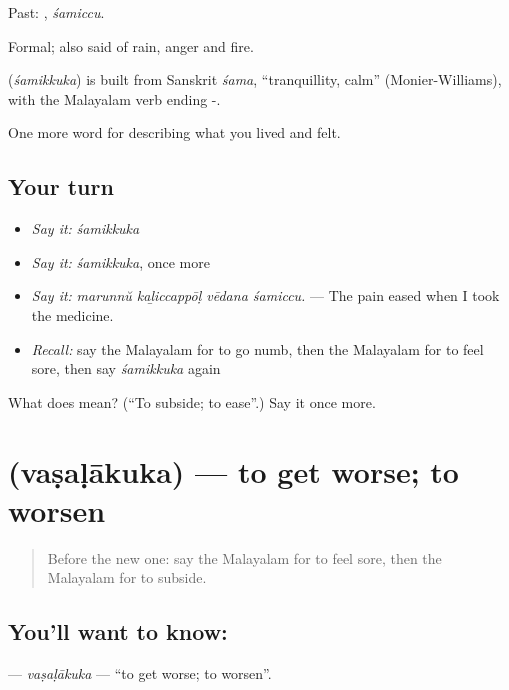 Past: , \emph{śamiccu}.

Formal; also said of rain, anger and fire.

\begin{cousinweb}
\textbf{} (\emph{śamikkuka}) is built from Sanskrit \emph{śama}, \textquotedblleft{}tranquillity, calm\textquotedblright{} (Monier-Williams), with the Malayalam verb ending -.
\end{cousinweb}

\begin{grammarlens}[title={What you've built}]
One more word for describing what you lived and felt.
\end{grammarlens}

\subsection*{Your turn}
\begin{itemize}
\raggedright
  \item \emph{Say it:} \emph{śamikkuka}
  \item \emph{Say it:} \emph{śamikkuka}, once more
  \item \emph{Say it:} \emph{marunnŭ kaḻiccappōḷ vēdana śamiccu.} — The pain eased when I took the medicine.
  \item \emph{Recall:} say the Malayalam for to go numb, then the Malayalam for to feel sore, then say \emph{śamikkuka} again
\end{itemize}

\begin{tcolorbox}[breakable,colback=teal!4,colframe=teal!35!black,title={Before you move on}]
What does  mean? (\textquotedblleft{}To subside; to ease\textquotedblright{}.) Say it once more.
\end{tcolorbox}
\section[\texorpdfstring{\ml{വഷളാകുക} (vaṣaḷākuka)}{വഷളാകുക (vaṣaḷākuka)}]{ (vaṣaḷākuka) — to get worse; to worsen}

\label{lesson:ML-C541-vasalakuka}



\begin{quote}
Before the new one: say the Malayalam for to feel sore, then the Malayalam for to subside.
\end{quote}

\subsection*{You'll want to know: }
\textbf{} — \emph{vaṣaḷākuka} — \textquotedblleft{}to get worse; to worsen\textquotedblright{}.


